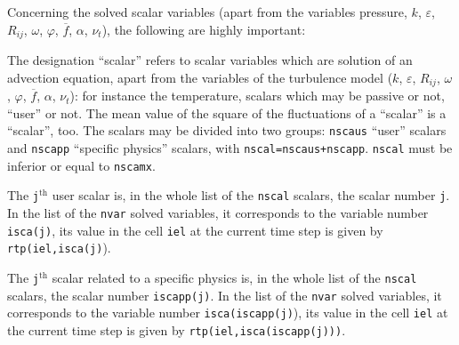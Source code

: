 {{{\bigskip

Concerning the solved scalar variables (apart from the variables
pressure, $k$, $\varepsilon$, $R_{ij}$, $\omega$, $\varphi$,
$\overline{f}$, $\alpha$, $\nu_t$), the following are highly important:
\begin{list}{-}{}
\item The designation ``scalar'' refers to scalar variables which are
      solution of an advection equation, apart from the variables of the
      turbulence model  ($k$, $\varepsilon$, $R_{ij}$, $\omega$,
      $\varphi$, $\overline{f}$, $\alpha$, $\nu_t$): for instance the temperature, scalars
      which may be passive or not, ``user'' or not. The mean value of
      the square of the fluctuations of a ``scalar'' is a
      ``scalar'', too. The scalars may be divided into two groups:
      \texttt{nscaus} ``user'' scalars and \texttt{nscapp}
      ``specific physics'' scalars, with
      \texttt{nscal=nscaus+nscapp}. \texttt{nscal} must be inferior or
       equal to \texttt{nscamx}.
\item The \texttt{j}$^{\text{th}}$ user scalar is, in
      the whole list of the \texttt{nscal} scalars, the scalar number
      \texttt{j}. In the list of the \texttt{nvar} solved variables, it
      corresponds to the variable number \texttt{isca(j)},
      its value in the cell \texttt{iel} at the current time step is given by
      \texttt{rtp(iel,isca(j)}).
\item The \texttt{j}$^{\text{th}}$ scalar related to a specific physics is, in
      the whole list of the \texttt{nscal} scalars, the scalar number
      \texttt{iscapp(j)}. In the list of the \texttt{nvar} solved variables, it
      corresponds to the variable number
      \texttt{isca(iscapp(j)}),
      its value in the cell \texttt{iel} at the current time step is given by
      \texttt{rtp(iel,isca(iscapp(j)))}.


\end{list}}}}
